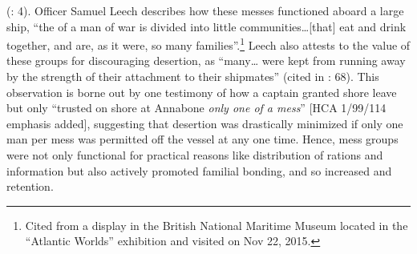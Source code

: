 (\citealt{Fury2015}: 4). Officer Samuel Leech describes how these messes functioned aboard a large ship, “the  of a man of war is divided into little communities…[that] eat and drink together, and are, as it were, so many families”.\footnote{Cited from a display in the British National Maritime Museum located in the “Atlantic Worlds” exhibition and visited on Nov 22, 2015.} Leech also attests to the value of these groups for discouraging desertion, as “many… were kept from running away by the strength of their attachment to their shipmates” (cited in \citealt{AdkinsAdkins2008}: 68). This observation is borne out by one testimony of how a captain granted shore leave but only “trusted on shore at Annabone \textit{only one of a mess}” [HCA 1/99/114 emphasis added], suggesting that desertion was drastically minimized if only one man per mess was permitted off the vessel at any one time. Hence, mess groups were not only functional for practical reasons like distribution of rations and information but also actively promoted familial bonding, and so increased  and  retention.  

